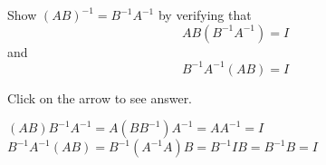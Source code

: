 \documentclass{ximera}
\begin{document}
\begin{problem}\label{prb:4.50}Show $\left( AB\right) ^{-1}=B^{-1}A^{-1}$ by verifying that
\begin{equation*}
AB\left(
B^{-1}A^{-1}\right) =I
\end{equation*} and
\begin{equation*}
B^{-1}A^{-1}\left( AB\right) =I
\end{equation*}

Click on the arrow to see answer.
\begin{expandable}{}{}
$\left( AB\right)
B^{-1}A^{-1}=A\left( BB^{-1}\right) A^{-1}=AA^{-1}=I$ $B^{-1}A^{-1}\left(
AB\right) =B^{-1}\left( A^{-1}A\right) B=B^{-1}IB=B^{-1}B=I$
\end{expandable}
\end{problem}
\end{document}
